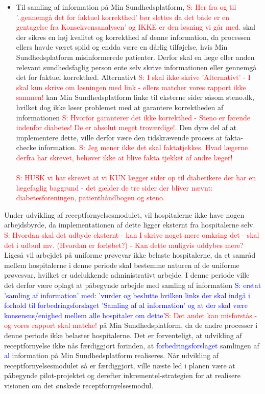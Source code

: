 \begin{itemize}
{}
	\item Til samling af information på Min Sundhedsplatform, \textcolor{red}{S: Her fra og til '..gennemgå det for faktuel korrekthed' bør slettes da det både er en gentagelse fra Konsekvensanalysen' og IKKE er den løsning vi går med.} skal der sikres en høj kvalitet og korrekthed af denne information, da processen ellers havde været spild og endda være en dårlig tilføjelse, hvis Min Sundhedsplatform misinformerede patienter. Derfor skal en læge eller anden relevant sundhedsfaglig person ente selv skrive informationen eller gennemgå det for faktuel korrekthed. Alternativt \textcolor{red}{S: I skal ikke skrive 'Alternativt' - I skal kun skrive om løsningen med link - ellers matcher vores rapport ikke sammen!}  kan Min Sundhedsplatform linke til eksterne sider såsom steno.dk, hvilket dog ikke løser problemet med at garantere korrektheden af informationen
	\textcolor{red}{S: Hvorfor garanterer det ikke korrekthed - Steno er førende indenfor diabetes! De er absolut meget troværdige!}. Den dyre del af at implementere dette, ville derfor være den tidskrævende process at fakta-checke information.
	\textcolor{red}{S: Jeg mener ikke det skal faktatjekkes. Hvad lægerne derfra har skrevet, behøver ikke at blive fakta tjekket af andre læger!
	}
\textcolor{red}{\\\\S: HUSK vi har skrevet at vi KUN lægger sider op til diabetikere der har en lægefaglig baggrund - det gælder de tre sider der bliver nævnt: diabetesforeningen, patienthåndbogen og steno.}
\end{itemize}
Under udvikling af receptfornyelsesmodulet, vil hospitalerne ikke have nogen arbejdsbyrde, da implementationen af dette ligger eksternt fra hospitalerne selv.
\textcolor{red}{S: Hvordan skal det udbyde eksternt - kan I skrive noget mere omkring det - skal det i udbud mv. (Hvordan er forløbet?) - Kan dette muligvis uddybes mere?} Ligeså vil arbejdet på uniforme prøvevar ikke belaste hospitalerne, da et samråd mellem hospitalerne i denne periode skal bestemme naturen af de uniforme prøvesvar, hvilket er udelukkende administrativt arbejde. I denne periode ville det derfor være oplagt at påbegynde arbejde med samling af information
\textcolor{blue}{S: erstat 'samling af information' med: 'vurder og beslutte hvilken links der skal indgå i forhold til forbedringsforslaget 'Samling af al information' og at der skal være konsensus/enighed mellem alle hospitaler om dette'}\textcolor{red}{S: Det andet kan misforstås - og vores rapport skal matche!}
 på Min Sundhedsplatform, da de andre processer i denne periode ikke belaster hospitalerne. Det er forventeligt, at udvikling af receptfornyelse ikke nås færdiggjort forinden, at \textcolor{blue}{forbedringsforslaget} samlingen af \textcolor{blue}{al} information på Min Sundhedsplatform realiseres. Når udvikling af receptfornyelsesmodulet så er færdiggjort, ville næste led i planen være at påbegynde pilot-projektet og derefter inkrementel-strategien for at realisere visionen om det ønskede receptfornyelsesmodul.
